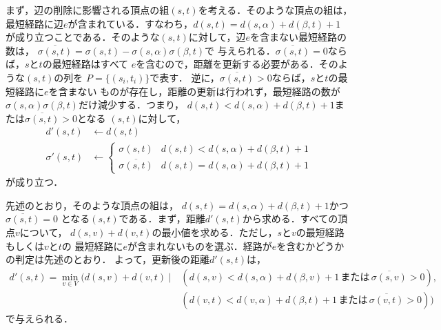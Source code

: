 まず，辺の削除に影響される頂点の組$(s,t)$を考える．そのような頂点の組は，
最短経路に辺$e$が含まれている．すなわち，$d(s,t) = d(s,\alpha)+d(\beta,t)+1$
が成り立つことである．そのような$(s,t)$に対して，辺$e$を含まない最短経路の数は，
$\overline{\sigma(s,t)}=\sigma(s,t)-\sigma(s,\alpha)\sigma(\beta,t)$で
与えられる．$\overline{\sigma(s,t)}=0$ならば，$s$と$t$の最短経路はすべて
$e$を含むので，距離を更新する必要がある．そのような$(s,t)$の列を
$P=\{(s_i,t_i)\}$で表す．
逆に，$\overline{\sigma(s,t)}>0$ならば，$s$と$t$の最短経路に$e$を含まない
ものが存在し，距離の更新は行われず，最短経路の数が
$\sigma(s,\alpha)\sigma(\beta,t)$だけ減少する．つまり，
$d(s,t)<d(s,\alpha)+d(\beta,t)+1$または$\overline{\sigma(s,t)}>0$となる
$(s,t)$に対して，
\begin{align*}
  d'(s,t) &\gets d(s,t) \\
  \sigma'(s,t) &\gets
  \begin{cases}
    \sigma(s,t) & d(s,t) < d(s,\alpha) + d(\beta,t) + 1 \\
    \overline{\sigma(s,t)} & d(s,t) = d(s,\alpha) + d(\beta,t) + 1
  \end{cases}
\end{align*}
が成り立つ．

先述のとおり，そのような頂点の組は，
$d(s,t)=d(s,\alpha)+d(\beta,t)+1$かつ$\overline{\sigma(s,t)}=0$
となる$(s,t)$である．まず，距離$d'(s,t)$から求める．すべての頂点$v$について，
$d(s,v)+d(v,t)$の最小値を求める．ただし，$s$と$v$の最短経路もしくは$v$と$t$の
最短経路に$e$が含まれないものを選ぶ．経路が$e$を含むかどうかの判定は先述のとおり．
よって，更新後の距離$d'(s,t)$は，
\begin{align*}
  d'(s,t) = \min_{v\in V}(d(s,v)+d(v,t)\:|\:
  &(d(s,v)<d(s,\alpha)+d(\beta,v)+1\,または\,\overline{\sigma(s,v)}>0),\\
  &(d(v,t)<d(v,\alpha)+d(\beta,t)+1\,または\,\overline{\sigma(v,t)}>0))
\end{align*}
で与えられる．

